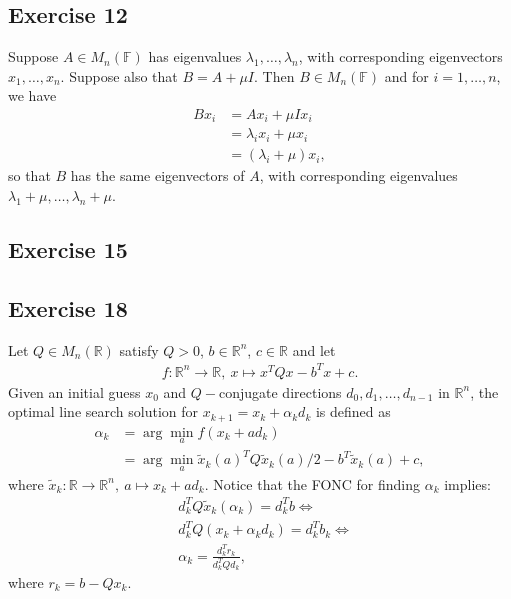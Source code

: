 \documentclass[11.5pt, letterpaper, bibtotoc,
    tablecaptionabove, figurecaptionabove]{article}
\begin{document}
\subsection*{Exercise 12}
Suppose $A\in M_n(\mathbb F)$ has eigenvalues $\lambda_1,\ldots,\lambda_n$,
with corresponding eigenvectors $x_1,\ldots,x_n$.
Suppose also that $B=A+\mu I$.
Then $B\in M_n(\mathbb F)$ and for $i=1,\ldots,n$, we have
\begin{align*}
    Bx_i&=Ax_i+\mu Ix_i\\
    &=\lambda_ix_i+\mu x_i\\
    &=(\lambda_i+\mu)x_i,
\end{align*}
so that $B$ has the same eigenvectors of $A$,
with corresponding eigenvalues $\lambda_1+\mu,\ldots,\lambda_n+\mu$.

\subsection*{Exercise 15}


\subsection*{Exercise 18}
Let $Q\in M_n(\mathbb R)$ satisfy $Q>0$,
$b\in\mathbb R^n$, $c\in\mathbb R$ and let
\begin{align*}
    f:\mathbb R^n\to\mathbb R,\ x\mapsto x^TQx-b^Tx+c.
\end{align*}
Given an initial guess $x_0$ and $Q-$conjugate directions $d_0,d_1,\ldots,d_{n-1}$
in $\mathbb R^n$, the optimal line search solution for
$x_{k+1}=x_k+\alpha_k d_k$ is defined as
\begin{align*}
    \alpha_k &= \arg\min_a f(x_k+ad_k)\\
    &=\arg\min_a \tilde{x}_k(a)^TQ\tilde{x}_k(a)/2-b^T\tilde{x}_k(a)+c,
\end{align*}
where $\tilde{x}_k:\mathbb R\to\mathbb R^n,\ a\mapsto x_k+ad_k$.
Notice that the FONC for finding $\alpha_k$ implies:
\begin{align*}
    &d_k^TQ\tilde{x}_k(\alpha_k)=d_k^Tb\Longleftrightarrow\\
    &d_k^TQ(x_k+\alpha_kd_k)=d_k^Tb_k\Longleftrightarrow\\
    &\alpha_k=\frac{d_k^Tr_k}{d_k^TQd_k},
\end{align*}
where $r_k=b-Qx_k$.
\end{document}
